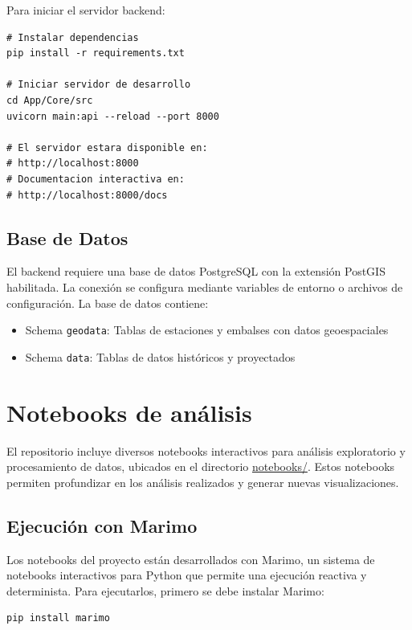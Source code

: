 Para iniciar el servidor backend:

\begin{lstlisting}[style=bash]
# Instalar dependencias
pip install -r requirements.txt

# Iniciar servidor de desarrollo
cd App/Core/src
uvicorn main:api --reload --port 8000

# El servidor estara disponible en:
# http://localhost:8000
# Documentacion interactiva en:
# http://localhost:8000/docs
\end{lstlisting}

\subsection{Base de Datos}

El backend requiere una base de datos PostgreSQL con la extensión PostGIS habilitada. La conexión se configura mediante variables de entorno o archivos de configuración. La base de datos contiene:

\begin{itemize}
    \item Schema \texttt{geodata}: Tablas de estaciones y embalses con datos geoespaciales
    \item Schema \texttt{data}: Tablas de datos históricos y proyectados
\end{itemize} 



\section{Notebooks de análisis}
\label{sec:chp5-1}

El repositorio incluye diversos notebooks interactivos para análisis exploratorio y procesamiento de datos, ubicados en el directorio \url{notebooks/}. Estos notebooks permiten profundizar en los análisis realizados y generar nuevas visualizaciones.

\subsection{Ejecución con Marimo}
\label{subsec:chp5-1-1}

Los notebooks del proyecto están desarrollados con Marimo\cite{marimo_license}, un sistema de notebooks interactivos para Python que permite una ejecución reactiva y determinista. Para ejecutarlos, primero se debe instalar Marimo:

\begin{lstlisting}[style=bash]
pip install marimo
\end{lstlisting}

